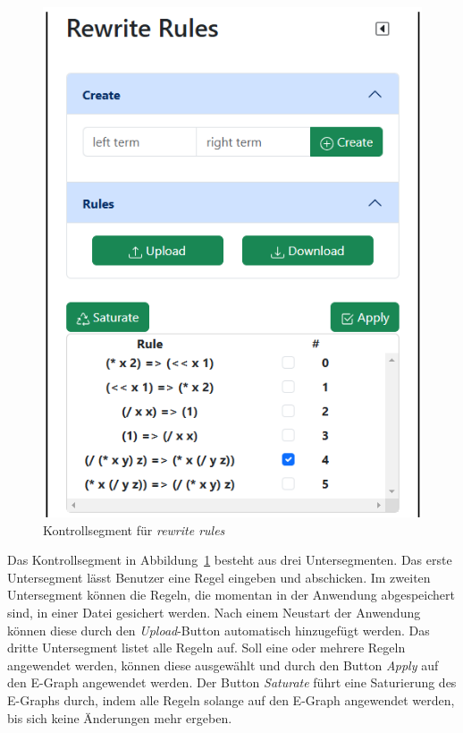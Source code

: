 \begin{figure}
    \vspace{-10mm}
    \begin{center}
      \includegraphics[scale=0.5]{../fig/rewriterulecontrol.png}
    \end{center}
    \caption{Kontrollsegment für \textit{rewrite rules}}
    \label{fig:segment2}
\end{figure}

Das Kontrollsegment in Abbildung~\ref{fig:segment2} besteht aus drei Untersegmenten. Das erste Untersegment lässt Benutzer eine Regel eingeben und abschicken.
Im zweiten Untersegment können die Regeln, die momentan in der Anwendung abgespeichert sind, in einer Datei gesichert werden. Nach einem Neustart der Anwendung können
diese durch den \textit{Upload}-Button automatisch hinzugefügt werden.  
Das dritte Untersegment listet alle Regeln auf. Soll eine oder mehrere Regeln angewendet werden, können diese ausgewählt und durch den Button \textit{Apply} auf den E-Graph angewendet werden.
Der Button \textit{Saturate} führt eine Saturierung des E-Graphs durch, indem alle Regeln solange auf den E-Graph angewendet werden, bis sich keine Änderungen mehr ergeben.

